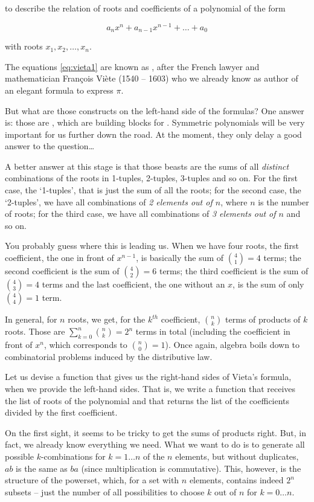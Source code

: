 \documentclass[tikz]{scrreprt}
\begin{document}
to describe the relation of roots and coefficients
of a polynomial of the form

\[
a_nx^n + a_{n-1}x^{n-1} + \dots + a_0
\]

with roots $x_1, x_2, \dots, x_n$.

The equations \ref{eq:vieta1} are known as
, after the French lawyer
and mathematician François Viète (1540 -- 1603)
who we already know as author of an elegant
formula to express $\pi$.

But what are those constructs on the left-hand
side of the formulas? One answer is:
those are ,
which are building blocks for .
Symmetric polynomials will be very important for us
further down the road. At the moment, they only delay
a good answer to the question\dots

A better answer at this stage is
that those beasts are the sums of
all \emph{distinct} combinations
of the roots in 1-tuples, 2-tuples, 3-tuples
and so on.
For the first case, the `1-tuples',
that is just the sum of all the roots;
for the second case, the `2-tuples',
we have all combinations of 
\emph{2 elements out of $n$}, where $n$
is the number of roots;
for the third case, we have all combinations
of \emph{3 elements out of $n$} and so on.

You probably guess where this is leading us.
When we have four roots,
the first coefficient,
the one in front of $x^{n-1}$,
is basically the sum
of $\binom{4}{1} = 4$ terms;
the second coefficient is the sum of
$\binom{4}{2} = 6$ terms;
the third coefficient is the sum of
$\binom{4}{3} = 4$ terms and
the last coefficient,
the one without an $x$, is the sum of
only $\binom{4}{4} = 1$ term.

In general, for $n$ roots, we get,
for the $k^{th}$ coefficient,
$\binom{n}{k}$ terms
of products of $k$ roots.
Those are $\sum_{k=0}^n{\binom{n}{k}} = 2^n$
terms in total 
(including the coefficient in front of $x^n$,
which corresponds to $\binom{n}{0}=1$).
Once again, algebra boils down to combinatorial
problems induced by the distributive law.

Let us devise a function 
that gives us the right-hand sides of Vieta's formula,
when we provide the left-hand sides.
That is, we write a function that receives the list
of roots of the polynomial and that returns the list
of the coefficients divided by the first coefficient.

On the first sight, it seems to be tricky to get
the sums of products right. But, in fact, we already
know everything we need. 
What we want to do is to generate
all possible $k$-combinations for $k=1\dots n$
of the $n$ elements, but without duplicates, \ie\
$ab$ is the same as $ba$ (since multiplication
is commutative).
This, however, is the structure of the powerset,
which, for a set with $n$ elements, contains indeed
$2^n$ subsets -- just the number of all possibilities
to choose $k$ out of $n$ for $k=0\dots n$.
\end{document}
